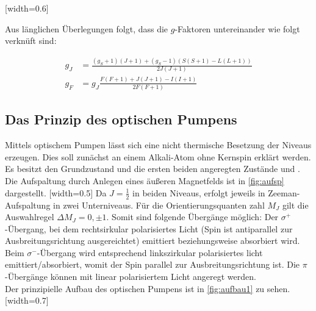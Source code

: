 [width=0.6\textwidth]

Aus länglichen Überlegungen folgt, dass die $g$-Faktoren untereinander wie folgt verknüft sind:

\begin{align}
  g_J &= \frac{(g_S+1)(J+1) + (g_S-1)(S(S+1)-L(L+1))}{2J(J+1)} \\
  \label{eqn:näherung}
  g_F &= g_J \frac{F(F+1)+J(J+1)-I(I+1)}{2F(F+1)}
\end{align}
\subsection{Das Prinzip des optischen Pumpens}
Mittels optischem Pumpen lässt sich eine nicht thermische Besetzung der Niveaus erzeugen. Dies soll zunächst an einem Alkali-Atom ohne Kernspin erklärt werden. Es besitzt den Grundzustand  und die ersten beiden angeregten Zustände  und . Die Aufspaltung durch Anlegen eines äußeren Magnetfelds ist in \autoref{fig:aufsp} dargestellt.
[width=0.5\textwidth]
Da $J=\frac{1}{2}$ in beiden Niveaus, erfolgt jeweils in Zeeman-Aufspaltung in zwei Unterniveaus. Für die Orientierungsquanten zahl $M_J$ gilt die Auswahlregel $\Delta M_J = 0,\pm1$. Somit sind folgende Übergänge möglich: Der $\sigma^+$-Übergang, bei dem rechtsirkular polarisiertes Licht (Spin ist antiparallel zur Ausbreitungsrichtung ausgereichtet) emittiert beziehungsweise absorbiert wird. Beim $\sigma^-$-Übergang wird entsprechend linkszirkular polarisiertes licht emittiert/absorbiert, womit der Spin parallel zur Ausbreitungsrichtung ist. Die $\pi$-Übergänge können mit linear polarisiertem Licht angeregt werden.\\
Der prinzipielle Aufbau des optischen Pumpens ist in \autoref{fig:aufbau1} zu sehen.
[width=0.7\textwidth]
